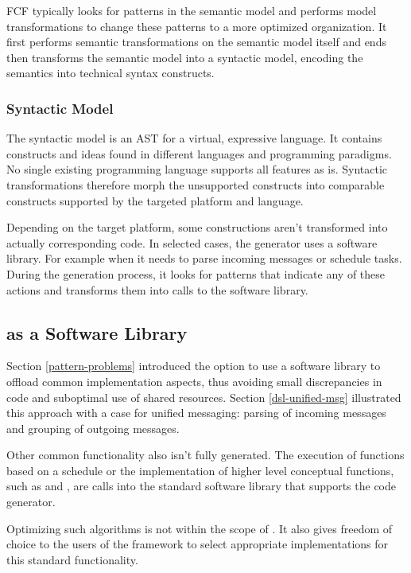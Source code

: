 \documentclass[conference]{IEEEtran}
\begin{document}
FCF typically looks for patterns in the semantic model and performs model
transformations to change these patterns to a more optimized organization. It
first performs semantic transformations on the semantic model itself and ends
then transforms the semantic model into a syntactic model, encoding the
semantics into technical syntax constructs.

\subsubsection{Syntactic Model}

The syntactic model is an AST for a virtual, expressive language. It contains
constructs and ideas found in different languages and programming paradigms. No
single existing programming language supports all features as is. Syntactic
transformations therefore morph the unsupported constructs into comparable
constructs supported by the targeted platform and language.

Depending on the target platform, some constructions aren't transformed into
actually corresponding code. In selected cases, the generator uses a software
library. For example when it needs to parse incoming messages or schedule
tasks. During the generation process, it looks for patterns that indicate any
of these actions and transforms them into calls to the \NAME software library.

\subsection{\NAME as a Software Library}
\label{software-lib-design}

Section \ref{pattern-problems} introduced the option to use a software library
to offload common implementation aspects, thus avoiding small discrepancies in
code and suboptimal use of shared resources. Section \ref{dsl-unified-msg}
illustrated this approach with a case for unified messaging: parsing of
incoming messages and grouping of outgoing messages.

Other common functionality also isn't fully generated. The execution of
functions based on a schedule or the implementation of higher level conceptual
functions, such as  and , are calls into the standard
software library that supports the code generator.

Optimizing such algorithms is not within the scope of \NAME. It also gives
freedom of choice to the users of the framework to select appropriate
implementations for this standard functionality.
\end{document}
